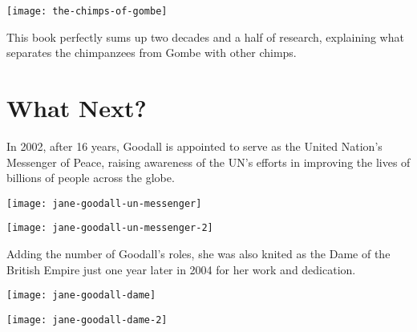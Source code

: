 \documentclass[12pt]{report}
\begin{document}
\texttt{[image: the-chimps-of-gombe]}

This book perfectly sums up two decades and a half of research, explaining what
separates the chimpanzees from Gombe with other chimps.

\pagebreak

\section*{What Next?}

In 2002, after 16 years, Goodall is appointed to serve as the United Nation's
Messenger of Peace, raising awareness of the UN's efforts in improving the
lives of billions of people across the globe.

\texttt{[image: jane-goodall-un-messenger]}

\texttt{[image: jane-goodall-un-messenger-2]}

\pagebreak

Adding the number of Goodall's roles, she was also knited as the Dame of the
British Empire just one year later in 2004 for her work and dedication.

\texttt{[image: jane-goodall-dame]}

\texttt{[image: jane-goodall-dame-2]}

\pagebreak
\end{document}
